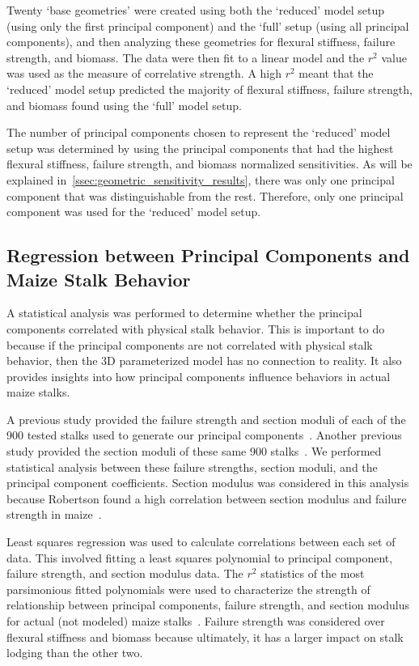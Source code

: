 Twenty ‘base geometries’ were created using both the ‘reduced’ model setup (using only the first principal component) and the ‘full’ setup (using all principal components), and then analyzing these geometries for flexural stiffness, failure strength, and biomass. The data were then fit to a linear model and the ${r^{2}}$ value was used as the measure of correlative strength. A high ${r^{2}}$ meant that the ‘reduced’ model setup predicted the majority of flexural stiffness, failure strength, and biomass found using the ‘full’ model setup.

The number of principal components chosen to represent the ‘reduced’ model setup was determined by using the principal components that had the highest flexural stiffness, failure strength, and biomass normalized sensitivities. As will be explained in~\cref{ssec:geometric_sensitivity_results}, there was only one principal component that was distinguishable from the rest. Therefore, only one principal component was used for the ‘reduced’ model setup.

\subsection{Regression between Principal Components and Maize Stalk Behavior}
\label{ssec:regression_between_principal_components_and_maize_stalk_behavior}
A statistical analysis was performed to determine whether the principal components correlated with physical stalk behavior. This is important to do because if the principal components are not correlated with physical stalk behavior, then the 3D parameterized model has no connection to reality. It also provides insights into how principal components influence behaviors in actual maize stalks.

A previous study provided the failure strength and section moduli of each of the 900 tested stalks used to generate our principal components~. Another previous study provided the section moduli of these same 900 stalks~. We performed statistical analysis between these failure strengths, section moduli, and the principal component coefficients. Section modulus was considered in this analysis because Robertson found a high correlation between section modulus and failure strength in maize~.

Least squares regression was used to calculate correlations between each set of data. This involved fitting a least squares polynomial to principal component, failure strength, and section modulus data. The ${r^{2}}$ statistics of the most parsimonious fitted polynomials were used to characterize the strength of relationship between principal components, failure strength, and section modulus for actual (not modeled) maize stalks~. Failure strength was considered over flexural stiffness and biomass because ultimately, it has a larger impact on stalk lodging than the other two. 

